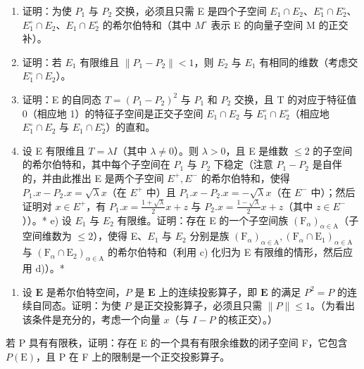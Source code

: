 \begin{enumerate}
\def\labelenumi{\alph{enumi})}
\item
  证明：为使 \(P_{1}\) 与 \(P_{2}\) 交换，必须且只需 E 是四个子空间 \(E_{1} \cap E_{2}\)、\(E_{1}^{\circ} \cap E_{2}^{\circ}\)、\(E_{1}^{\circ} \cap E_{2}\)、\(E_{1} \cap E_{2}^{\circ}\) 的希尔伯特和（其中 \(M^{\circ}\) 表示 E 的向量子空间 M 的正交补）。
\item
  证明：若 \(E_{1}\) 有限维且 \(\|P_{1}-P_{2}\|<1\)，则 \(E_{2}\) 与 \(E_{1}\) 有相同的维数（考虑交 \(E_{1}^{\circ}\cap E_{2}\)）。
\item
  证明：E 的自同态 \(T=(P_{1}-P_{2})^{2}\) 与 \(P_{1}\) 和 \(P_{2}\) 交换，且 T 的对应于特征值 0（相应地 1）的特征子空间是正交子空间 \(E_{1}\cap E_{2}\) 与 \(E_{1}^{\circ}\cap E_{2}^{\circ}\)（相应地 \(E_{1}^{\circ}\cap E_{2}\) 与 \(E_{1}\cap E_{2}^{\circ}\)）的直和。
\item
  设 E 有限维且 \(T=\lambda I\)（其中 \(\lambda\neq0\)）。则 \(\lambda>0\)，且 E 是维数 \(\leqslant2\) 的子空间的希尔伯特和，其中每个子空间在 \(P_{1}\) 与 \(P_{2}\) 下稳定（注意 \(P_{1}-P_{2}\) 是自伴的，并由此推出 E 是两个子空间 \(E^{+},E^{-}\) 的希尔伯特和，使得 \(P_{1}.x-P_{2}.x=\sqrt{\lambda}x\)（在 \(E^{+}\) 中）且 \(P_{1}.x-P_{2}.x=-\sqrt{\lambda}x\)（在 \(E^{-}\) 中）；然后证明对 \(x\in E^{+}\)，有 \(P_{1}.x=\frac{1+\sqrt{\lambda}}{2}x+z\) 与 \(P_{2}.x=\frac{1-\sqrt{\lambda}}{2}x+z\)（其中 \(z\in E^{-}\)））。* e) 设 \(E_{1}\) 与 \(E_{2}\) 有限维。证明：存在 E 的一个子空间族 \((\mathrm{F}_{\alpha})_{\alpha\in\mathrm{A}}\)（子空间维数为 \(\leqslant2\)），使得 E、\(E_{1}\) 与 \(E_{2}\) 分别是族 \((\mathrm{F}_{\alpha})_{\alpha\in\mathrm{A}},(\mathrm{F}_{\alpha}\cap\mathrm{E}_{1})_{\alpha\in\mathrm{A}}\) 与 \((\mathrm{F}_{\alpha}\cap\mathrm{E}_{2})_{\alpha\in\mathrm{A}}\) 的希尔伯特和（利用 c) 化归为 E 有限维的情形，然后应用 d)）。*
\end{enumerate}

\begin{enumerate}
\def\labelenumi{\arabic{enumi})}
\setcounter{enumi}{15}
\tightlist
\item
  设 \(\mathbf{E}\) 是希尔伯特空间，\(P\) 是 \(\mathbf{E}\) 上的连续投影算子，即 \(\mathbf{E}\) 的满足 \(P^2 = P\) 的连续自同态。证明：为使 \(P\) 是正交投影算子，必须且只需 \(\| P \| \leqslant 1\)。（为看出该条件是充分的，考虑一个向量 \(x\)（与 \(I - P\) 的核正交）。）
\end{enumerate}

若 P 具有有限秩，证明：存在 E 的一个具有有限余维数的闭子空间 F，它包含 \(P(\mathrm{E})\)，且 P 在 F 上的限制是一个正交投影算子。

